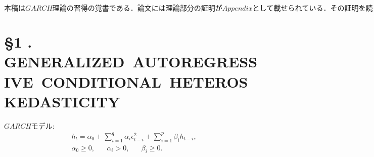 \documentclass[8pt]{jsarticle}
\newcommand{\Section}[2]{\section*{\S #1 .\hspace{5pt} #2}}
\begin{document}
$本稿は GARCH 理論の習得の覚書である．論文には理論部分の証明が Appendix として載せられている．
その証明を読まないとモデルが何を表しているのかわからないので自分でも読んで書いて覚えようとするのだけれども，省略されている部分を懇切丁寧に補ってもらわないと
僕が付いて行けないので，後学のために証明にくどいほど補間して書き直しておくのである．$

\Section{1}{GENERALIZED\ AUTOREGRESSIVE\ CONDITIONAL\ HETEROSKEDASTICITY}

$GARCH$モデル:
\begin{eqnarray*}
	&h_t = \alpha_0 + \sum_{i=1}^{q} \alpha_i \epsilon_{t-i}^2 + \sum_{i=1}^{p} \beta_i h_{t-i}, \\
	&\alpha_0 \geq 0, \hspace{20pt} \alpha_i > 0, \hspace{20pt} \beta_i \geq 0.
\end{eqnarray*}
\end{document}
